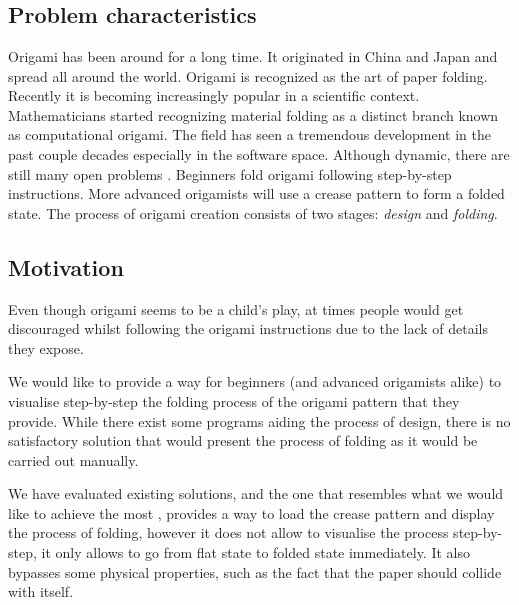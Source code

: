 \documentclass[english,12pt]{aghthesis}
\author{Antoni Mleczko \\ Maciej Mionskowski}
\date{\the\year}
\begin{document}
\maketitle

\section{\SectionTitleProjectVision}
\label{sec:cel-wizja}
\subsection{Problem characteristics}
Origami has been around for a long time. It originated in China and Japan and spread all around the world.\cite{wiki:history-of-origami} Origami is recognized as the art of paper folding. Recently it is becoming increasingly popular in a scientific context.
Mathematicians started recognizing material folding as a distinct branch known as computational origami. The field has seen a tremendous development in the past couple decades especially in the software space. Although dynamic, there are still many open problems \cite{mit-open-problems}. Beginners fold origami following step-by-step instructions. More advanced origamists will use a crease pattern to form a folded state. 
The process of origami creation consists of two stages: \textit{design} and \textit{folding}.
\begin{figure}
\end{figure}

\subsection{Motivation}

Even though origami seems to be a child's play, at times
people would get discouraged whilst following the origami instructions due to
the lack of details they expose.

We would like to provide a way for beginners (and advanced origamists alike) to visualise step-by-step the folding process of the origami pattern that they provide.
While there exist some programs aiding the process of design, there is no satisfactory solution
that would present the process of folding as it would be carried out manually.

We have evaluated existing solutions, and the one that resembles 
what we would like to achieve the most \cite{origami-simulator}, provides a way to load the crease pattern
and display the process of folding, however it does not allow to visualise the process step-by-step, it only allows 
to go from flat state to folded state immediately. It also bypasses some physical properties, such as the fact that the
paper should collide with itself.
\end{document}
